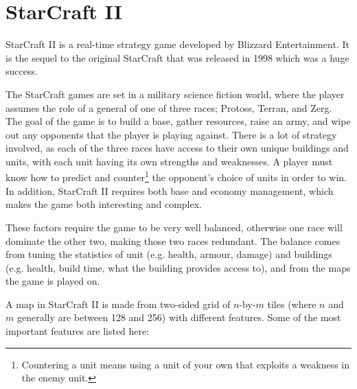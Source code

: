 \section{StarCraft II}
\label{introduction_starcraft}

StarCraft II\cite{starcraft2} is a real-time strategy game developed by Blizzard Entertainment. It is the sequel to the original StarCraft\cite{starcraft} that was released in 1998 which was a huge success.

The StarCraft games are set in a military science fiction world, where the player assumes the role of a general of one of three races; Protoss, Terran, and Zerg. The goal of the game is to build a base, gather resources, raise an army, and wipe out any opponents that the player is playing against. There is a lot of strategy involved, as each of the three races have access to their own unique buildings and units, with each unit having its own strengths and weaknesses. A player must know how to predict and counter\footnote{Countering a unit means using a unit of your own that exploits a weakness in the enemy unit.} the opponent's choice of units in order to win. In addition, StarCraft II requires both base and economy management, which makes the game both interesting and complex.


These factors require the game to be very well balanced, otherwise one race will dominate the other two, making those two races redundant. The balance comes from tuning the statistics of unit (e.g. health, armour, damage) and buildings (e.g. health, build time, what the building provides access to), and from the maps the game is played on.

A map in StarCraft II is made from two-sided grid of $n$-by-$m$ tiles (where $n$ and $m$ generally are between 128 and 256) with different features. Some of the most important features are listed here:

